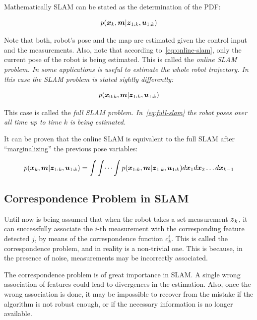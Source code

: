 Mathematically SLAM can be stated as the determination of the PDF:

\begin{equation}
p(\boldsymbol{x}_k,\boldsymbol{m}|\boldsymbol{z}_{1:k},\boldsymbol{u}_{1:k})
\label{eq:online-slam}
\end{equation} 

\noindent
Note that both, robot's pose and the map are estimated given the control input and the measurements. Also, note that according to~\eqref{eq:online-slam}, only the current pose of the robot is being estimated. This is called the \it{online SLAM} problem. In some applications is useful to estimate the whole robot trajectory. In this case the SLAM problem is stated sightly differently:

\begin{equation}
p(\boldsymbol{x}_{0:k},\boldsymbol{m}|\boldsymbol{z}_{1:k},\boldsymbol{u}_{1:k})
\label{eq:full-slam}
\end{equation} 

This case is called the \it{full SLAM} problem. In~\eqref{eq:full-slam} the robot poses over all time up to time $k$ is being estimated.

It can be proven that the online SLAM is equivalent to the full SLAM after ``marginalizing'' the previous pose variables:

\begin{equation}
p(\boldsymbol{x}_k,\boldsymbol{m}|\boldsymbol{z}_{1:k},\boldsymbol{u}_{1:k}) = \int \int \dots \int 
p(\boldsymbol{x}_{1:k},\boldsymbol{m}|\boldsymbol{z}_{1:k},\boldsymbol{u}_{1:k}) d\boldsymbol{x}_1 d\boldsymbol{x}_2 \dots d\boldsymbol{x}_{k-1}
\end{equation}

\subsection{Correspondence Problem in SLAM}

Until now is being assumed that when the robot takes a set measurement $\boldsymbol{z}_k$, it can successfully associate the $i$-th measurement with the corresponding feature detected $j$, by means of the correspondence function $c_k^i$. This is called the correspondence problem, and in reality is a non-trivial one. This is because, in the presence of noise, measurements may be incorrectly associated. 

The correspondence problem is of great importance in SLAM. A single wrong association of features could lead to divergences in the estimation. Also, once the wrong association is done, it may be impossible to recover from the mistake if the algorithm is not robust enough, or if the necessary information is no longer available.


